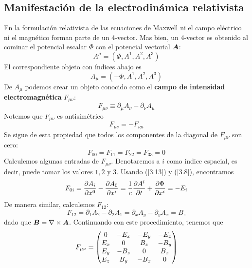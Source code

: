 \subsection{Manifestación de la electrodinámica relativista}
En la formulación relativista de las ecuaciones de Maxwell ni el campo eléctrico ni el magnético forman parte de un 4-vector. Mas bien, un 4-vector es obtenido al cominar el potencial escalar $\Phi$ con el potencial vectorial $\vb*{A}$:
\begin{equation}\label{3.11}
    A^\mu=(\Phi,A^1,A^2,A^3)
\end{equation}
El correspondiente objeto con índices abajo es
\begin{equation}\label{3.12}
    A_\mu=(-\Phi,A^1,A^2,A^3)
\end{equation}
De $A_\mu$ podemos crear un objeto conocido como el \textbf{campo de intensidad electromagnética} $F_{\mu\nu}$:
\begin{equation}\label{3.13}
    \boxed{F_{\mu\nu}\equiv \partial_\mu A_\nu-\partial_\nu A_\mu}
\end{equation}
Notemos que $F_{\mu\nu}$ es antisimétrico
\begin{equation}\label{3.14}
    F_{\mu\nu}=-F_{\nu\mu}
\end{equation}
Se sigue de esta propiedad que todos los componentes de la diagonal de $F_{\mu\nu}$ son cero:
\begin{equation}\label{3.15}
    F_{00}=F_{11}=F_{22}=F_{33}=0
\end{equation}
Calculemos algunas entradas de $F_{\mu\nu}$. Denotaremos a $i$ como índice espacial, es decir, puede tomar los valores $1,2$ y $3$. Usando (\ref{3.13}) y (\ref{3.8}), encontramos
\begin{equation}\label{3.16}
    F_{0i}=\pdv{A_i}{x^0}-\pdv{A_0}{x^{i}}=\frac{1}{c}\pdv{A^{i}}{t}+\pdv{\Phi}{x^{i}}=-E_i
\end{equation}
De manera similar, calculemos $F_{12}$:
\begin{equation}\label{3.17}
    F_{12}=\partial _1A_2-\partial_2A_1=\partial_x A_y-\partial_yA_x=B_z
\end{equation}
dado que $\vb*{B}=\nabla\times\vb*{A}$. Continuando con este procedimiento, tenemos que
\begin{equation}\label{3.18}
    F_{\mu\nu}=\mqty(0&-E_x&-E_y&-E_z\\E_x&0&B_z&-B_y\\E_y&-B_z&0&B_x\\E_z&B_y&-B_x&0)
\end{equation}
